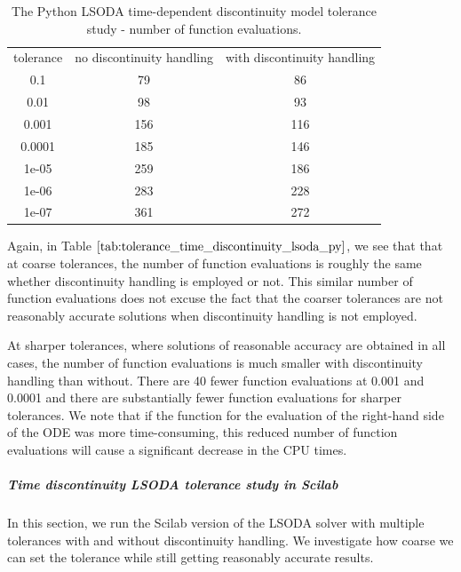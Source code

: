 \begin{table}[H]
\caption {The Python LSODA time-dependent discontinuity model tolerance study - number of function evaluations.} \label{tab:tolerance_time_discontinuity_lsoda_py} 
\begin{center}
\begin{tabular}{ c c c }
tolerance & no discontinuity handling & with discontinuity handling \\ 
0.1 & 79 & 86 \\
0.01 & 98 & 93 \\
0.001 & 156 & 116 \\
0.0001 & 185 & 146 \\
1e-05 & 259 & 186 \\
1e-06 & 283 & 228 \\
1e-07 & 361 & 272 \\
\end{tabular}
\end{center}
\end{table}
Again, in Table $\ref{tab:tolerance_time_discontinuity_lsoda_py}$, we see that that at coarse tolerances, the number of function evaluations is roughly the same whether discontinuity handling is employed or not. This similar number of function evaluations does not excuse the fact that the coarser tolerances are not reasonably accurate solutions when discontinuity handling is not employed.

At sharper tolerances, where solutions of reasonable accuracy are obtained in all cases, the number of function evaluations is much smaller with discontinuity handling than without. There are 40 fewer function evaluations at 0.001 and 0.0001 and there are substantially fewer function evaluations for sharper tolerances. We note that if the function for the evaluation of the right-hand side of the ODE was more time-consuming, this reduced number of function evaluations will cause a significant decrease in the CPU times.

\subparagraph{Time discontinuity LSODA tolerance study in Scilab}
In this section, we run the Scilab version of the LSODA solver with multiple tolerances with and without discontinuity handling. We investigate how coarse we can set the tolerance while still getting reasonably accurate results.

